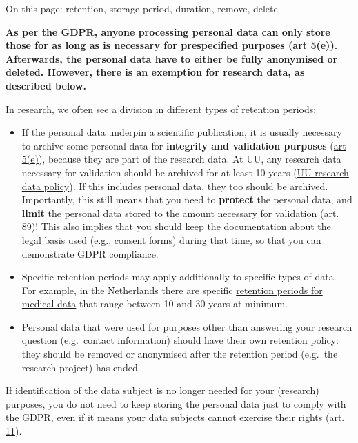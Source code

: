\documentclass[
]{book}
\providecommand{\tightlist}{%
  \setlength{\itemsep}{0pt}\setlength{\parskip}{0pt}}
\begin{document}
On this page: retention, storage period, duration, remove, delete

\textbf{As per the GDPR, anyone processing personal data can only store those for as
long as is necessary for prespecified purposes
(\href{https://gdpr-info.eu/art-5-gdpr/}{art 5(e)}).
Afterwards, the personal data have to either be fully anonymised or deleted.
However, there is an exemption for research data, as described below.}

In research, we often see a division in different types of retention periods:

\begin{itemize}
\tightlist
\item
  If the personal data underpin a scientific publication, it is usually necessary
  to archive some personal data for \textbf{integrity and validation purposes}
  (\href{https://gdpr-info.eu/art-5-gdpr/}{art 5(e)}),
  because they are part of the research data. At UU, any research data necessary
  for validation should be archived for at least 10 years
  (\href{https://www.uu.nl/sites/default/files/university_policy_framework_for_research_data_utrecht_university_-_january_2016.pdf}{UU research data policy}).
  If this includes personal data, they too should be archived. Importantly, this
  still means that you need to \textbf{protect} the personal data, and \textbf{limit} the personal
  data stored to the amount necessary for validation
  (\href{https://gdpr-info.eu/art-89-gdpr/}{art. 89})!
  This also implies that you should keep the documentation about the legal basis
  used (e.g., consent forms) during that time, so that you can demonstrate GDPR
  compliance.
\item
  Specific retention periods may apply additionally to specific types of data.
  For example, in the Netherlands there are specific
  \href{https://english.ccmo.nl/investigators/data-retention-periods-for-medical-research}{retention periods for medical data}
  that range between 10 and 30 years at minimum.
\item
  Personal data that were used for purposes other than answering your
  research question (e.g.~contact information) should have their own retention
  policy: they should be removed or anonymised after the retention period
  (e.g.~the research project) has ended.
\end{itemize}

If identification of the data subject is no longer needed for your
(research) purposes, you do not need to keep storing the personal data just
to comply with the GDPR, even if it means your data subjects cannot exercise
their rights (\href{https://gdpr-info.eu/art-11-gdpr/}{art. 11}).
\end{document}
